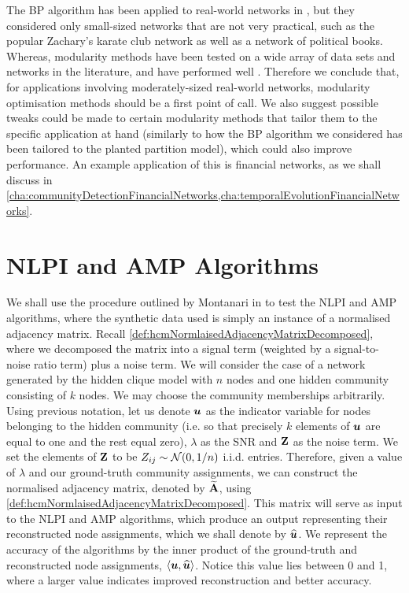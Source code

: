 The BP algorithm has been applied to real-world networks in \cite{DKM+13}, but they considered only small-sized networks that are not very practical, such as the popular Zachary's karate club network as well as a network of political books.
Whereas, modularity methods have been tested on a wide array of data sets and networks in the literature, and have performed well \cite{For10}.
Therefore we conclude that, for applications involving moderately-sized real-world networks, modularity optimisation methods should be a first point of call.
We also suggest possible tweaks could be made to certain modularity methods that tailor them to the specific application at hand (similarly to how the BP algorithm we considered has been tailored to the planted partition model), which could also improve performance.
An example application of this is financial networks, as we shall discuss in \cref{cha:communityDetectionFinancialNetworks,cha:temporalEvolutionFinancialNetworks}.


\section{NLPI and AMP Algorithms}
\label{sec:NLPIAndAMPAlgorithms}

We shall use the procedure outlined by Montanari in \cite{Mon13} to test the NLPI and AMP algorithms, where the synthetic data used is simply an instance of a normalised adjacency matrix. Recall \cref{def:hcmNormlaisedAdjacencyMatrixDecomposed}, where we decomposed the matrix into a signal term (weighted by a signal-to-noise ratio term) plus a noise term.
We will consider the case of a network generated by the hidden clique model with $n$ nodes and one hidden community consisting of $k$ nodes.
We may choose the community memberships arbitrarily. Using previous notation, let us denote $\vecvar{u}$ as the indicator variable for nodes belonging to the hidden community (i.e. so that precisely $k$ elements of $\vecvar{u}$ are equal to one and the rest equal zero), $\lambda$ as the SNR and $\mathbf Z$ as the noise term.
We set the elements of $\mathbf Z$ to be $Z_{ij} \sim \normal{0,1/n}$ i.i.d. entries.
Therefore, given a value of $\lambda$ and our ground-truth community assignments, we can construct the normalised adjacency matrix, denoted by $\widetilde{\mathbf A}$, using \cref{def:hcmNormlaisedAdjacencyMatrixDecomposed}.
This matrix will serve as input to the NLPI and AMP algorithms, which produce an output representing their reconstructed node assignments, which we shall denote by $\widehat{\vecvar{u}}$.
We represent the accuracy of the algorithms by the inner product of the ground-truth and reconstructed node assignments, $\innerP{\vecvar{u},\widehat{\vecvar{u}}}$.
Notice this value lies between 0 and 1, where a larger value indicates improved reconstruction and better accuracy.

